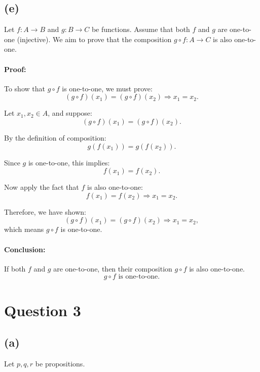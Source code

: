 \documentclass{article}
\begin{document}
\subsection*{(e)}

Let \( f : A \to B \) and \( g : B \to C \) be functions.  
Assume that both \( f \) and \( g \) are one-to-one (injective).  
We aim to prove that the composition \( g \circ f : A \to C \) is also one-to-one.

\paragraph{Proof:}

To show that \( g \circ f \) is one-to-one, we must prove:
\[
(g \circ f)(x_1) = (g \circ f)(x_2) \Rightarrow x_1 = x_2.
\]

Let \( x_1, x_2 \in A \), and suppose:
\[
(g \circ f)(x_1) = (g \circ f)(x_2).
\]

By the definition of composition:
\[
g(f(x_1)) = g(f(x_2)).
\]

Since \( g \) is one-to-one, this implies:
\[
f(x_1) = f(x_2).
\]

Now apply the fact that \( f \) is also one-to-one:
\[
f(x_1) = f(x_2) \Rightarrow x_1 = x_2.
\]

Therefore, we have shown:
\[
(g \circ f)(x_1) = (g \circ f)(x_2) \Rightarrow x_1 = x_2,
\]
which means \( g \circ f \) is one-to-one.

\paragraph{Conclusion:}  
If both \( f \) and \( g \) are one-to-one, then their composition \( g \circ f \) is also one-to-one.
\[
\boxed{g \circ f \text{ is one-to-one.}}
\]

\section*{Question 3}

\subsection*{(a)}

Let \( p, q, r \) be propositions.
\end{document}

